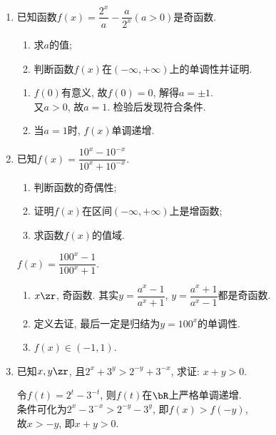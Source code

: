 \begin{enumerate}
\item 已知函数$f(x)=\dfrac{2^x}{a}-\dfrac{a}{2^x}(a>0)$是奇函数. 
\begin{enumerate}[(1)]
\item 求$a$的值; 
\item 判断函数$f(x)$在$(-\infty,+\infty)$上的单调性并证明. 
\end{enumerate}
\begin{jieda}
\begin{enumerate}[(1)]
\item $f(0)$有意义, 故$f(0)=0$, 解得$a=\pm1$. \\
又$a>0$, 故$a=1$. 检验后发现符合条件. 
\item 当$a=1$时, $f(x)$单调递增. 
\end{enumerate}
\end{jieda}


\item 已知$f(x)=\dfrac{10^x-10^{-x}}{10^x+10^{-x}}$.
\begin{enumerate}[(1)]
\item 判断函数的奇偶性;
\item 证明$f(x)$在区间$(-\infty ,+\infty )$上是增函数;
\item 求函数$f(x)$的值域.
\end{enumerate}
\begin{jieda}
$f(x)=\dfrac{100^x-1}{100^x+1}$. 
\begin{enumerate}[(1)]
\item $x\zr$, 奇函数. 其实$y=\dfrac{a^x-1}{a^x+1}$, $y=\dfrac{a^x+1}{a^x-1}$都是奇函数. 
\item 定义去证, 最后一定是归结为$y=100^x$的单调性. 
\item $f(x)\in(-1,1)$. 
\end{enumerate}
\end{jieda}


\item 已知$x,y\zr$, 且$2^x+3^y>2^{-y}+3^{-x}$, 求证: $x+y>0$. 
\begin{jieda}
令$f(t)=2^t-3^{-t}$, 则$f(t)$在$\bR$上严格单调递增. \\
条件可化为$2^x-3^{-x}>2^{-y}-3^y$, 即$f(x)>f(-y)$, \\
故$x>-y$, 即$x+y>0$. 
\end{jieda}



\end{enumerate}
